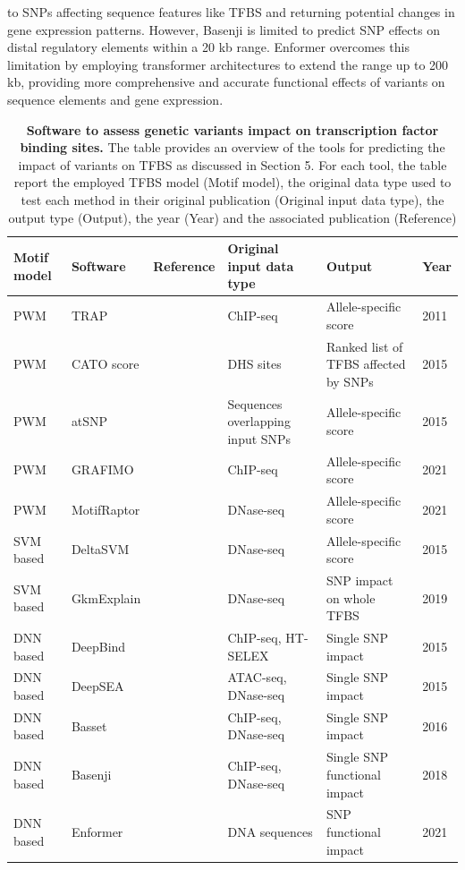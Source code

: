 \documentclass[a4paper, titlepage, openright]{book}
\newcommand{\grafimo}{GRAFIMO\xspace}
\newcommand{\motifraptor}{MotifRaptor\xspace}
\begin{document}
to SNPs affecting sequence features like TFBS and returning potential changes in gene expression patterns. However, Basenji is limited to predict SNP effects on distal regulatory elements within a 20 kb range. Enformer \citep{avsec2021effective} overcomes this limitation by employing transformer architectures to extend the range up to 200 kb, providing more comprehensive and accurate functional effects of variants on sequence elements and gene expression.
\begin{table}
	\centering
	\begin{tabular}{|p{2cm}|p{2cm}|p{3cm}|p{3cm}|p{3cm}|p{1cm}|}
		\hline
		\textbf{Motif model}& \textbf{Software}&\textbf{Reference}&\textbf{Original input data type}& \textbf{Output}& \textbf{Year} \\
		\hline
		PWM & TRAP & \citep{thomas2011transcription} & ChIP-seq & Allele-specific score & 2011 \\
		\hline
		PWM & CATO score & \citep{maurano2015large} & DHS sites & Ranked list of TFBS affected by SNPs & 2015 \\
		\hline
		PWM & atSNP & \citep{zuo2015atsnp} & Sequences overlapping input SNPs  &  Allele-specific score  & 2015 \\
		\hline
		PWM & \grafimo & \citep{tognon2021grafimo} & ChIP-seq  &  Allele-specific score  & 2021 \\
		\hline
		PWM & \motifraptor & \citep{yao2021motif} & DNase-seq  &  Allele-specific score  & 2021 \\
		\hline
		SVM based & DeltaSVM & \citep{lee2015method} & DNase-seq  &  Allele-specific score  & 2015 \\
		\hline
		SVM based & GkmExplain & \citep{shrikumar2019gkmexplain} & DNase-seq  &  SNP impact on whole TFBS  & 2019 \\
		\hline
		DNN based & DeepBind & \citep{alipanahi2015predicting} & ChIP-seq, HT-SELEX &  Single SNP impact  & 2015 \\
		\hline
		DNN based & DeepSEA & \citep{zhou2015predicting} & ATAC-seq, DNase-seq  &  Single SNP impact  & 2015 \\
		\hline
		DNN based & Basset & \citep{kelley2016basset} & ChIP-seq, DNase-seq  &  Single SNP impact  & 2016 \\
		\hline
		DNN based & Basenji & \citep{kelley2018sequential} & ChIP-seq, DNase-seq  &  Single SNP functional impact  & 2018 \\
		\hline
		DNN based & Enformer & \citep{avsec2021effective} & DNA sequences  &  SNP functional impact  & 2021 \\
		\hline
	\end{tabular}
	\caption[Software to assess genetic variants impact on transcription factor binding sites.]{\textbf{Software to assess genetic variants impact on transcription factor binding sites.} The table provides an overview of the tools for predicting the impact of variants on TFBS as discussed in Section 5. For each tool, the table report the employed TFBS model (Motif model), the original data type used to test each method in their original publication (Original input data type), the output type (Output), the year (Year) and the associated publication (Reference)}
	\label{table:tfvariants}
\end{table}
\end{document}
